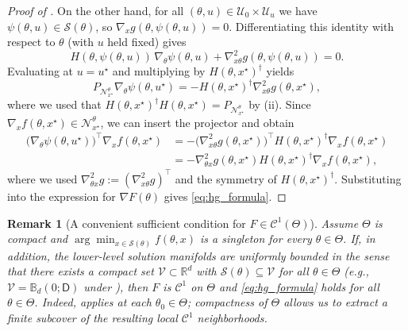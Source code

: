 \documentclass{article}
\theoremstyle{normaltheorem}
\newtheorem{remark}[remark]{Remark}
\newcommand{\R}{\mathbb{R}}
\newcommand{\calS}{\mathcal{S}}
\newcommand{\calN}{\mathcal{N}}
\begin{document}
\begin{proof}[Proof of ]
		On the other hand, for all $(\theta,u)\in\mathcal U_0\times \mathcal U_u$ we have $\psi(\theta,u)\in\calS(\theta)$, so
		$\nabla_x g(\theta,\psi(\theta,u))=0$.
		Differentiating this identity with respect to $\theta$ (with $u$ held fixed) gives
		\[
		H(\theta,\psi(\theta,u))\,\nabla_\theta \psi(\theta,u)+\nabla_{x\theta}^2 g(\theta,\psi(\theta,u))=0.
		\]
		Evaluating at $u=u^\star$ and multiplying by $H(\theta,x^\star)^\dagger$ yields
		\[
		P_{\calN_{x^\star}^\theta}\nabla_\theta \psi(\theta,u^\star)
		=
		-H(\theta,x^\star)^\dagger\nabla_{x\theta}^2 g(\theta,x^\star),
		\]
		where we used that $H(\theta,x^\star)^\dagger H(\theta,x^\star)=P_{\calN_{x^\star}^\theta}$ by (ii).
		Since $\nabla_x f(\theta,x^\star)\in \calN_{x^\star}^\theta$, we can insert the projector and obtain
			\begin{align*}
			    \big(\nabla_\theta \psi(\theta,u^\star)\big)^\top \nabla_x f(\theta,x^\star)
			&=
			-\big(\nabla_{x\theta}^2 g(\theta,x^\star)\big)^\top
			H(\theta,x^\star)^\dagger\nabla_x f(\theta,x^\star)\\
			&=
			-\nabla_{\theta x}^2 g(\theta,x^\star)H(\theta,x^\star)^\dagger\nabla_x f(\theta,x^\star),
			\end{align*}
		where we used $\nabla^2_{\theta x}g:=(\nabla^2_{x\theta}g)^\top$ and the symmetry of \(H(\theta,x^\star)^\dagger\).
			Substituting into the expression for $\nabla F(\theta)$ gives \eqref{eq:hg_formula}.
			\end{proof}
\begin{remark}[A convenient sufficient condition for $F\in\mathcal{C}^{1}(\Theta)$]\label{rem:global-C1}
				Assume $\Theta$ is compact and $\arg\min_{x\in\calS(\theta)} f(\theta,x)$ is a singleton for every $\theta\in\Theta$.
				If, in addition, the lower-level solution manifolds are uniformly bounded in the sense that there exists a compact set $\mathcal V\subset\R^d$ with $\calS(\theta)\subseteq\mathcal V$ for all $\theta\in\Theta$
				(e.g., $\mathcal V=\mathbb B_d(0;\mathsf D)$ under ),
				then $F$ is $\mathcal{C}^{1}$ on $\Theta$ and \eqref{eq:hg_formula} holds for all $\theta\in\Theta$.
				Indeed,  applies at each $\theta_0\in\Theta$; compactness of $\Theta$ allows us to extract a finite subcover of the resulting local $\mathcal{C}^{1}$ neighborhoods.
				\end{remark}

\end{document}
